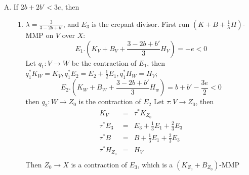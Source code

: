 \documentclass{article}
\begin{document}
\begin{enumerate}[(A)]
\begin{enumerate}[(1)]
    \begin{itemize} 
      \item $ V\to V'_2\to Z_1 $ is contraction of curve $ B $ and $ E_1 $ (which is a $ (K+B+\frac{1}{\lambda_1}H) $-MMP over $ X_1 $);
      $$ B.(K_V+B_V+\frac{1}{\lambda_1}H_V)=e-b-1<0 $$
      $$ E_1.(K_{V_2'}+eE_1+eE_2+b'E_3+\frac{1}{\lambda_1}H_{V_2'})=-e<0 $$
      \item $ Z_1\to X_1 $ is a contraction of $ E_3 $ (which is a  $ (K+B) $-MMP over $ X $);
      $$ E_3.(K_{Z_1}+eE_2+b'E_3)=E_3.(K_{V_2'}+eE_2+\frac{e}{2}E_1+b'E_3)=-1-b'<0 $$
      \item $ Z_1\to X_2 $ is contraction of curve $ E_2 $ (which is a $ (K+B+\frac{1}{\lambda_1}H) $-MMP over pt)
      $$ E_3.(K_{Z_1}+eE_2+b'E_3+\frac{1}{\lambda_1}H_{Z_1})=E_3.(K_{V_2'}+eE_2+\frac{e}{2}E_1+b'E_3+(1+b-e)H_{V_2'})=-1+b'-\frac{e}{2}<0 $$
    \end{itemize} 
    $$ \xymatrix{&&&V_3\ar[ld]\ar@{=}[r]&V\ar[ddd]\ar@{=}[r]&V_3'\ar[rd]\\
      &&V_2\ar[ld]\ar[rd]&&&&V_2'\ar[rd]\ar[dl]\\
      &V_1\ar[ld]&&Z_0\ar[llld]\ar[rd]&&Z_1\ar[rd]\ar[ld]&&V_1'\ar[rd]\\
      X_0&&&&X_1&&X_2\ar@{.>}[rr]&&X'
    } $$
  Consider $ V_2'\to Z_1\to X_2 $ and $ V_2'\to V_1'\to X' $, by rigidity lemma, $ X_2\cong X' $.
  \end{enumerate}
  \item If $ 2b+2b'< 3e $, then
  \begin{enumerate}[(1)]
    \item  $ \lambda=\frac{3}{3-2b+b'} $, and $ E_3 $ is the crepant divisor. First run $ (K+B+\frac{1}{\lambda}H) $-MMP on $ V $ over $ X $:
    $$ E_1.(K_V+B_V+\frac{3-2b+b'}{3}H_V)=-e<0 $$
    Let $ q_1:V\to W $ be the contraction of $ E_1 $, then $ q_1^*K_W=K_V,q_1^*E_2=E_2+\frac{1}{2}E_1,q_1^*H_W=H_V $;
    $$ E_2.(K_W+B_W+\frac{3-2b+b'}{3}H_w)=b+b'-\frac{3e}{2}<0 $$
    then $ q_2:W\to Z_0 $ is the contraction of $ E_2 $
    Let $ \tau:V\to Z_0 $, then
    $$ \begin{array}{rcl}
      K_V&=&\tau^*K_{Z_0} \\
      \tau^*E_3&=&E_3+\frac{1}{3}E_1+\frac{2}{3}E_3\\
      \tau^*B&=&B+\frac{1}{3}E_1+\frac{2}{3}E_3\\
      \tau^*H_{Z_0}&=&H_V\\
    \end{array} $$
    Then $ Z_0\to X $ is a contraction of $ E_3 $, which is a $ (K_{Z_0}+B_{Z_0}) $-MMP

\end{enumerate}
\end{enumerate}
\end{document}
